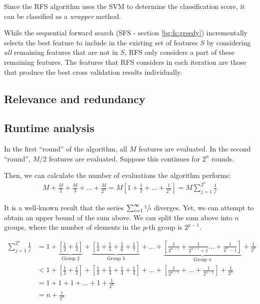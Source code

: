 \documentclass[12pt, twoside, a4paper]{report}
\begin{document}
Since the RFS algorithm uses the SVM to determine the classification score, it can be classified as a \textit{wrapper} method.

While the sequential forward search (SFS - section \ref{bg:fs:greedy}) incrementally selects the best feature to include in the existing set of features $S$ by considering \textit{all} remaining features that are not in $S$, RFS only considers a part of these remaining features. The features that RFS considers in each iteration are those that produce the best cross validation results individually.

\subsection{Relevance and redundancy}

\subsection{Runtime analysis}
In the first ``round'' of the algorithm, all $M$ features are evaluated. In the second ``round'', $M/2$ features are evaluated. Suppose this continues for $2^n$ rounds.

Then, we can calculate the number of evaluations the algorithm performs:
\begin{align*}
M+\frac{M}{2}+\frac{M}{3}+\dots+\frac{M}{2^n} = M\left[ 1+\frac{1}{2}+\dots+\frac{1}{2^n} \right]=M \sum_{j=1}^{2^n} \frac{1}{j}
\end{align*}

It is a well-known result that the series $\sum_{i=1}^{\infty} \sfrac{1}{i}$ diverges. Yet, we can attempt to obtain an upper bound of the sum above. We can split the sum above into $n$ groups, where the number of elements in the $p$-th group is $2^{p-1}$.

\begin{align*}
\sum_{j=1}^{2^n} \frac{1}{j}
&= 1 + \underbrace{\left[ \frac{1}{2} + \frac{1}{3} \right]}_{\text{Group 2}} + \underbrace{\left[ \frac{1}{4} + \frac{1}{5} + \frac{1}{6} + \frac{1}{7} \right]}_{\text{Group 3}} + \dots + \underbrace{\left[ \frac{1}{2^{n-1}} + \frac{1}{2^{n-1}+1} \dots + \frac{1}{2^{n}-1} \right]}_{\text{Group $n$}} + \frac{1}{2^n} \\
&< 1 + \left[ \frac{1}{2} + \frac{1}{2} \right] + \left[ \frac{1}{4} + \frac{1}{4} + \frac{1}{4} + \frac{1}{4} \right] + \dots + \left[ \frac{1}{2^{n-1}} + \dots + \frac{1}{2^{n-1}} \right] + \frac{1}{2^n} \\
&= 1+1+1+ \dots + 1 + \frac{1}{2^n} \\
&= n + \frac{1}{2^n}
\end{align*}
\end{document}
